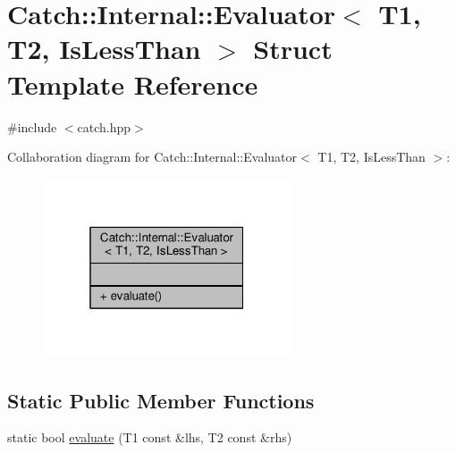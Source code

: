 \hypertarget{struct_catch_1_1_internal_1_1_evaluator_3_01_t1_00_01_t2_00_01_is_less_than_01_4}{\section{Catch\-:\-:Internal\-:\-:Evaluator$<$ T1, T2, Is\-Less\-Than $>$ Struct Template Reference}
\label{struct_catch_1_1_internal_1_1_evaluator_3_01_t1_00_01_t2_00_01_is_less_than_01_4}
}


{\ttfamily \#include $<$catch.\-hpp$>$}



Collaboration diagram for Catch\-:\-:Internal\-:\-:Evaluator$<$ T1, T2, Is\-Less\-Than $>$\-:
\nopagebreak
\begin{figure}[H]
\begin{center}
\leavevmode
\includegraphics[width=208pt]{struct_catch_1_1_internal_1_1_evaluator_3_01_t1_00_01_t2_00_01_is_less_than_01_4__coll__graph}
\end{center}
\end{figure}
\subsection*{Static Public Member Functions}
\begin{DoxyCompactItemize}
\item 
static bool \hyperlink{struct_catch_1_1_internal_1_1_evaluator_3_01_t1_00_01_t2_00_01_is_less_than_01_4_a75b2bcf80ce6f90218c145e2c3293d75}{evaluate} (T1 const \&lhs, T2 const \&rhs)
\end{DoxyCompactItemize}


